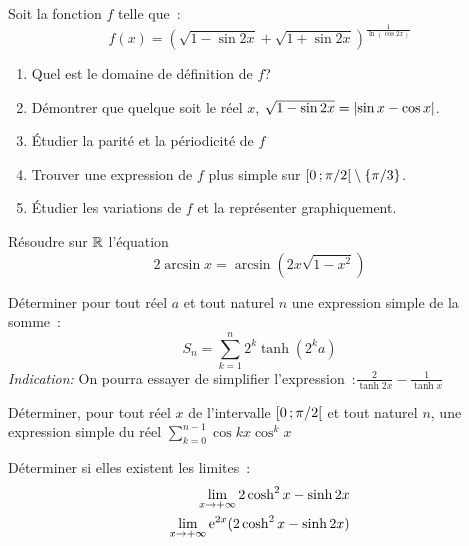 \begin{exercice}
  Soit la fonction \(f\) telle que~:
  \begin{equation}
    f(x) = {(\sqrt{1-\sin 2x}+\sqrt{1+\sin 2x})}^{\frac{1}{\ln(\cos 2x)}}
  \end{equation}
  \begin{enumerate}
    \item Quel est le domaine de définition de \(f\)?
    \item Démontrer que quelque soit le réel \(x\), \(\sqrt{1-\sin 2x} =
      \left\lvert\sin x - \cos x\right\rvert\).
    \item Étudier la parité et la périodicité de \(f\)
    \item Trouver une expression de \(f\) plus simple sur
      \(\left[ 0 \, ; {} \pi/2 \right[\setminus\{\pi/3\}\).
    \item Étudier les variations de \(f\) et la représenter graphiquement.
  \end{enumerate}
\end{exercice}

\begin{exercice}
  Résoudre sur \(\mathbb{R}\) l'équation
  \begin{equation}
    2\arcsin x = \arcsin(2x\sqrt{1-x^2})
  \end{equation}
\end{exercice}

\begin{exercice}
  Déterminer pour tout réel \(a\) et tout naturel \(n\) une expression simple
  de la somme~:
  \begin{equation}
    S_n = \sum_{k = 1}^n 2^k \tanh(2^k a)
  \end{equation}
  \emph{Indication:} On pourra essayer de simplifier
  l'expression~:\(\frac{2}{\tanh 2x} - \frac{1}{\tanh x}\)
\end{exercice}

\begin{exercice}
  Déterminer, pour tout réel \(x\) de l'intervalle \(\left[ 0 \, ; {} \pi/2 \right[\)
  et tout naturel \(n\), une expression simple du réel \(\sum_{k = 0}^{n -
  1}{\cos kx}{\cos^k x}\)
\end{exercice}

\begin{exercice}
  Déterminer si elles existent les limites~:
  \begin{align*}
    \lim\limits_{x \to +\infty} 2\cosh^2x-\sinh 2x \\
    \lim\limits_{x \to +\infty} \operatorname{e}^{2x}(2\cosh^2x-\sinh 2x)
  \end{align*}
\end{exercice}

